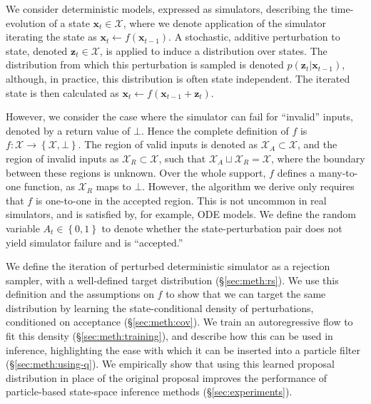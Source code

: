 \label{sec:meth}

We consider deterministic models, expressed as simulators, describing the time-evolution of a state $\mathbf{x}_t \in \mathcal{X}$, where we denote application of the simulator iterating the state as $\mathbf{x}_t \gets f(\mathbf{x}_{t-1})$.
A stochastic, additive perturbation to state, denoted $\mathbf{z}_t \in \mathcal{X}$, is applied to induce a distribution over states.
The distribution from which this perturbation is sampled is denoted $p(\mathbf{z}_t | \mathbf{x}_{t-1})$, although, in practice, this distribution is often state independent.
The iterated state is then calculated as $\mathbf{x}_t \gets f(\mathbf{x}_{t-1} + \mathbf{z}_t)$.

However, we consider the case where the simulator can fail for ``invalid'' inputs, denoted by a return value of $\bot$.
Hence the complete definition of $f$ is ${f:\mathcal{X} \rightarrow \left\lbrace \mathcal{X}, \bot \right\rbrace}$.
The region of valid inputs is denoted as ${\mathcal{X}_{A} \subset \mathcal{X}}$, and the region of invalid inputs as ${\mathcal{X}_{R} \subset \mathcal{X}}$, such that ${\mathcal{X}_{A} \sqcup \mathcal{X}_{R} = \mathcal{X}}$, where the boundary between these regions is unknown.
Over the whole support, $f$ defines a many-to-one function, as $\mathcal{X}_R$ maps to $\bot$.
However, the algorithm we derive only requires that $f$ is one-to-one in the accepted region.
This is not uncommon in real simulators, and is satisfied by, for example, ODE models.
We define the random variable $A_t \in \left\lbrace 0, 1 \right\rbrace$ to denote whether the state-perturbation pair does not yield simulator failure and is ``accepted.''

We define the iteration of perturbed deterministic simulator as a rejection sampler, with a well-defined target distribution (\S\ref{sec:meth:rs}).
We use this definition and the assumptions on $f$ to show that we can target the same distribution by learning the state-conditional density of perturbations, conditioned on acceptance (\S\ref{sec:meth:cov}).
We train an autoregressive flow to fit this density (\S\ref{sec:meth:training}), and describe how this can be used in inference, highlighting the ease with which it can be inserted into a particle filter (\S\ref{sec:meth:using-q}).
We empirically show that using this learned proposal distribution in place of the original proposal improves the performance of particle-based state-space inference methods (\S\ref{sec:experiments}).

